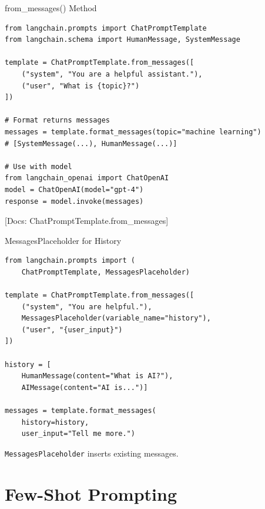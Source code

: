 \documentclass[aspectratio=169,11pt]{beamer}
\newcommand{\docref}[1]{{\scriptsize\color{docgray}[Docs: #1]}}
\begin{document}
\begin{frame}[fragile]{from\_messages() Method}
  \begin{codebox}
    \begin{lstlisting}
from langchain.prompts import ChatPromptTemplate
from langchain.schema import HumanMessage, SystemMessage

template = ChatPromptTemplate.from_messages([
    ("system", "You are a helpful assistant."),
    ("user", "What is {topic}?")
])

# Format returns messages
messages = template.format_messages(topic="machine learning")
# [SystemMessage(...), HumanMessage(...)]

# Use with model
from langchain_openai import ChatOpenAI
model = ChatOpenAI(model="gpt-4")
response = model.invoke(messages)
    \end{lstlisting}
  \end{codebox}

  \docref{ChatPromptTemplate.from\_messages}
\end{frame}

\begin{frame}[fragile]{MessagesPlaceholder for History}
  \begin{codebox}
    \begin{lstlisting}[basicstyle=\ttfamily\tiny]
from langchain.prompts import (
    ChatPromptTemplate, MessagesPlaceholder)

template = ChatPromptTemplate.from_messages([
    ("system", "You are helpful."),
    MessagesPlaceholder(variable_name="history"),
    ("user", "{user_input}")
])

history = [
    HumanMessage(content="What is AI?"),
    AIMessage(content="AI is...")]

messages = template.format_messages(
    history=history,
    user_input="Tell me more.")
    \end{lstlisting}
  \end{codebox}

  \begin{tipbox}
    \texttt{MessagesPlaceholder} inserts existing messages.
  \end{tipbox}
\end{frame}

\section{Few-Shot Prompting}
\end{document}
